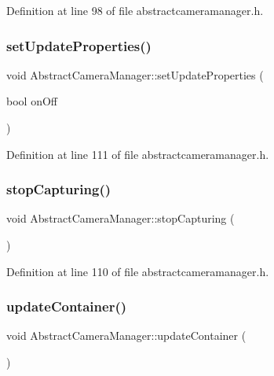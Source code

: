 Definition at line 98 of file abstractcameramanager.\+h.

\mbox{\label{class_abstract_camera_manager_abd6c2f0822bef37ca5625b8d3aa43e56}} 
\subsubsection{\texorpdfstring{setUpdateProperties()}{setUpdateProperties()}}
{\footnotesize\ttfamily void Abstract\+Camera\+Manager\+::set\+Update\+Properties (\begin{DoxyParamCaption}\item[{bool}]{on\+Off }\end{DoxyParamCaption})\hspace{0.3cm}{\ttfamily [inline]}}



Definition at line 111 of file abstractcameramanager.\+h.

\mbox{\label{class_abstract_camera_manager_a5aefb0e4ae48767ead04581a4ee940a8}} 
\subsubsection{\texorpdfstring{stopCapturing()}{stopCapturing()}}
{\footnotesize\ttfamily void Abstract\+Camera\+Manager\+::stop\+Capturing (\begin{DoxyParamCaption}{ }\end{DoxyParamCaption})\hspace{0.3cm}{\ttfamily [inline]}}



Definition at line 110 of file abstractcameramanager.\+h.

\mbox{\label{class_abstract_camera_manager_a419cecb816ee7fe4c3074f4f6a6d41f9}} 
\subsubsection{\texorpdfstring{updateContainer()}{updateContainer()}}
{\footnotesize\ttfamily void Abstract\+Camera\+Manager\+::update\+Container (\begin{DoxyParamCaption}{ }\end{DoxyParamCaption})\hspace{0.3cm}{\ttfamily [inline]}}



